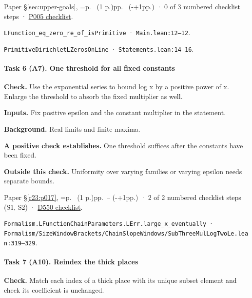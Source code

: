 Paper \S\ref{sec:upper-goals}, \ifnum{}=\relax p.\ \pageref{pn:P005} (1 p.)\else pp.\ \pageref{pn:P005} (\number\numexpr{}-+1\relax pp.)\fi{} · 0 of 3 numbered checklist steps · \href{https://github.com/GunheeC/rh-lean-verification-atlas/blob/v0.1.0/units/P005.check.md}{P005 checklist}.

\nolinkurl{LFunction_eq_zero_re_of_isPrimitive} · \nolinkurl{Main.lean:12–12}.

\nolinkurl{PrimitiveDirichletLZerosOnLine} · \nolinkurl{Statements.lean:14–16}.

\paragraph{Task 6 (A7). One threshold for all fixed constants}\label{v7:task-6}

\textbf{Check.} Use the exponential series to bound log x by a positive power of x. Enlarge the threshold to absorb the fixed multiplier as well.

\textbf{Inputs.} Fix positive epsilon and the constant multiplier in the statement.

\textbf{Background.} Real limits and finite maxima.

\textbf{A positive check establishes.} One threshold suffices after the constants have been fixed.

\textbf{Outside this check.} Uniformity over varying families or varying epsilon needs separate bounds.

Paper \S\ref{r23:p017}, \ifnum{}=\relax p.\ \pageref{r24:d550} (1 p.)\else pp.\ \pageref{r24:d550}--\pageref{v5:d550-end} (\number\numexpr{}-+1\relax pp.)\fi{} · 2 of 2 numbered checklist steps (S1, S2) · \href{https://github.com/GunheeC/rh-lean-verification-atlas/blob/v0.1.0/units/D550.check.md}{D550 checklist}.

\nolinkurl{Formalism.LFunctionChainParameters.LErr.large_x_eventually} · \nolinkurl{Formalism/SizeWindowBrackets/ChainSlopeWindows/SubThreeMulLogTwoLe.lean:319–329}.

\paragraph{Task 7 (A10). Reindex the thick places}\label{v7:task-7}

\textbf{Check.} Match each index of a thick place with its unique subset element and check its coefficient is unchanged.

